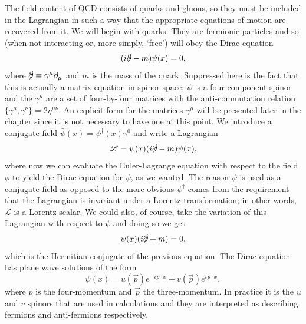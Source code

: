 The field content of QCD consists of quarks and gluons, so they must be included in the Lagrangian in such a way that the appropriate equations of motion are recovered from it. We will begin with quarks. They are fermionic particles and so (when not interacting or, more simply, `free') will obey the Dirac equation
\begin{equation}
(i \slashed{\partial} - m) \psi(x) = 0,
\end{equation}
where $\slashed{\partial} \equiv \gamma^\mu \partial_\mu$ and $m$ is the mass of the quark. Suppressed here is the fact that this is actually a matrix equation in spinor space; $\psi$ is a four-component spinor and the $\gamma^\mu$ are a set of four-by-four matrices with the anti-commutation relation $\{\gamma^\mu, \gamma^\nu\} = 2 \eta^{\mu \nu}$. An explicit form for the matrices $\gamma^\mu$ will be presented later in the chapter since it is not necessary to have one at this point. We introduce a conjugate field $\bar{\psi}(x) = \psi^\dagger(x) \gamma^0$ and write a Lagrangian
\begin{equation}
\mathscr{L} = \bar{\psi}(x)(i \slashed{\partial} - m) \psi(x),
\end{equation}
where now we can evaluate the Euler-Lagrange equation with respect to the field $\bar{\phi}$ to yield the Dirac equation for $\psi$, as we wanted. The reason $\bar{\psi}$ is used as a conjugate field as opposed to the more obvious $\psi^\dagger$ comes from the requirement that the Lagrangian is invariant under a Lorentz transformation; in other words, $\mathscr{L}$ is a Lorentz scalar. We could also, of course, take the variation of this Lagrangian with respect to $\psi$ and doing so we get
\begin{equation}
\bar{\psi}(x)(i \slashed{\partial} + m) = 0,
\end{equation}
which is the Hermitian conjugate of the previous equation. The Dirac equation has plane wave solutions of the form
\begin{equation}
\label{eqn:dirac}
\psi(x) = u\left(\vec{p}\right )e^{- i \hspace{1pt}p \cdot x} + v\left(\vec{p}\right ) e^{i \hspace{1pt} p \cdot x},
\end{equation}
where $p$ is the four-momentum and $\vec{p}$ the three-momentum. In practice it is the $u$ and $v$ spinors that are used in calculations and they are interpreted as describing fermions and anti-fermions respectively. 

